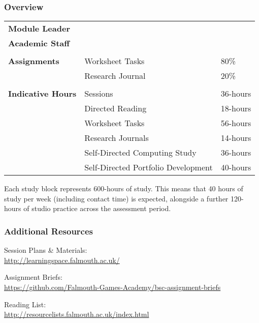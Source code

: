 \documentclass[handout, xcolor={dvipsnames}]{beamer}\usepackage{etoolbox}\newtoggle{printable}\toggletrue{printable}
\begin{document}
\begin{frame}
	\frametitle{Overview}
	
	\centering
		\tiny
		\def\arraystretch{1.5}
		\begin{tabular} { | p{} | p{} p{} |}
		
			\textbf{Module Leader} &  
			\moduleLeader &
			\\

			\textbf{Academic Staff} &  
			\academicStaff &
			\\
			
			&&\\
			
			\textbf{Assignments} &  
			Worksheet Tasks &
			80\% \\
			
			&  
			Research Journal &
			20\% \\
			
			&&\\
						
			\textbf{Indicative Hours} &  
			Sessions &
			36-hours \\
			
			&
			Directed Reading &
			18-hours \\
			
			&  
			Worksheet Tasks &
			56-hours \\
			
			&
			Research Journals &
			14-hours \\
									
			&
			Self-Directed Computing Study &
			36-hours \\
			
			&
			Self-Directed Portfolio Development &
			40-hours \\
			
		\end{tabular}
		
		\vspace{2em}
		\raggedright
		Each study block represents 600-hours of study. This means that 40 hours of study per week (including contact time) is expected, alongside a further 120-hours of studio practice across the assessment period.

\end{frame}

\begin{frame}
	\frametitle{Additional Resources}
	
	Session Plans \& Materials: \\
	\url{http://learningspace.falmouth.ac.uk/}
	
	\vspace{1.5em}	
	
	Assignment Briefs: \\
	\url{https://github.com/Falmouth-Games-Academy/bsc-assignment-briefs}

	\vspace{1.5em}	
	
	Reading List: \\
	\url{http://resourcelists.falmouth.ac.uk/index.html}

\end{frame}
\end{document}
